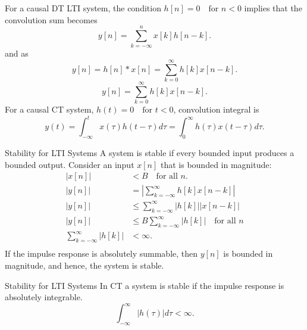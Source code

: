 \begin{frame}
    For a causal DT LTI system, the condition $h[n] = 0\quad \text{for } n < 0$ implies that the convolution sum becomes
        \begin{equation*}
            y[n] = \sum_{k=-\infty}^{n}x[k]h[n-k].
        \end{equation*}
    and as
    \begin{equation*}
        y[n] = h[n]\ast x[n] = \sum_{k=0}^{\infty}h[k]x[n-k].
    \end{equation*}
    \begin{equation*}
        y[n] = \sum_{k=0}^{\infty}h[k]x[n-k].
    \end{equation*}
    \pause
    For a causal CT system, $h(t) = 0\quad \text{for } t < 0$, convolution integral is
    \begin{equation*}
        y(t) = \int_{-\infty}^{t}x(\tau)h(t - \tau)d\tau = \int_{0}^{\infty}h(\tau)x(t - \tau)d\tau.
    \end{equation*}
\end{frame}

\begin{frame}{Stability for LTI Systems}
A system is stable if every bounded input produces a bounded output. Consider an input $x[n]$ that is bounded in magnitude:
    \begin{align*}
        |x[n]| &< B \quad \text{for all } n.\\
      |y[n]| &= \left| \sum_{k=-\infty}^{\infty}h[k]x[n-k]\right| \\
      |y[n]| &\leq  \sum_{k=-\infty}^{\infty}|h[k]||x[n-k]|\\
      |y[n]| &\leq  B\sum_{k=-\infty}^{\infty}|h[k]|\quad \text{for all } n\\
      \sum_{k=-\infty}^{\infty}|h[k]| &< \infty.\\
    \end{align*}
    If the impulse response is absolutely summable, then $y[n]$ is bounded in magnitude, and hence, the system is stable.

\end{frame}

\begin{frame}{Stability for LTI Systems}
    In CT a system is stable if the impulse response is \alert{absolutely integrable}.
    \begin{equation*}
        \int_{-\infty}^{\infty}|h(\tau)|d\tau < \infty.
    \end{equation*}
\end{frame}




